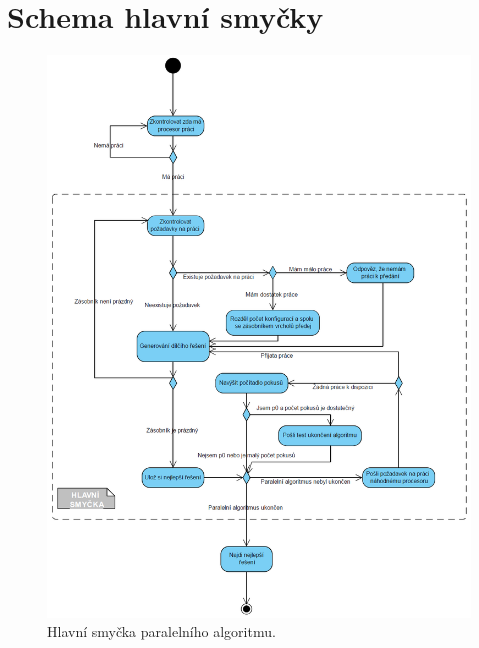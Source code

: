 \documentclass[12pt]{article}
\begin{document}
\newpage
\appendix

\section{Schema hlavní smyčky}

\begin{figure}[ht]
\centering       
\includegraphics[scale=0.33]{while.jpg}
\caption{Hlavní smyčka paralelního algoritmu.}
\label{hlavniSmycka}
\end{figure}
\end{document}

